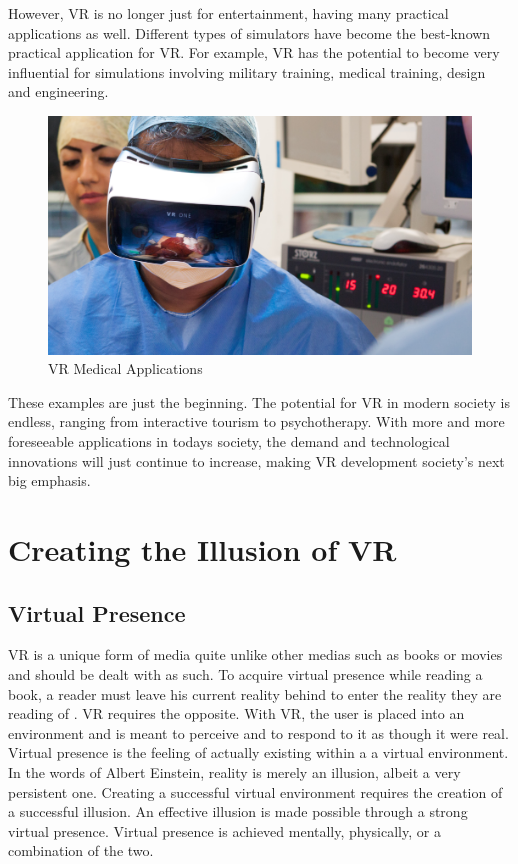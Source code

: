 \documentclass[12pt]{article}
\begin{document}
\par However, VR is no longer just for entertainment, having many practical applications as well. Different types of simulators have become the best-known practical application for VR. For example, VR has the potential to become very influential for simulations involving military training, medical training, design and engineering. 

 \begin{figure}[h]
    \centering
 \includegraphics[width=.6\textwidth]{photo2_health}
  \caption{VR Medical Applications \cite{applications}}
  \label{fig:applications}
 \end{figure}
 
These examples are just the beginning. The potential for VR in modern society is endless,  ranging from interactive tourism to psychotherapy.
With more and more foreseeable applications in todays society, the demand and technological innovations will just continue to increase, making VR development society's next big emphasis.  \\





\section{Creating the Illusion of VR}

\subsection{Virtual Presence}

VR is a unique form of media quite unlike other medias such as books or movies and should be dealt with as such. To acquire virtual presence while reading a book, a reader must leave his current reality behind to enter the reality they are reading of \cite{mihelj}. VR requires the opposite. With VR, the user is placed into an environment and is meant to perceive and to respond to it as though it were real. Virtual presence is the feeling of actually existing within a a virtual environment. In the words of Albert Einstein, reality is merely an illusion, albeit a very persistent one. Creating a successful virtual environment requires the creation of a successful illusion.  An effective illusion is made possible through a strong virtual presence. Virtual presence is achieved mentally, physically, or a combination of the two. 
\end{document}
